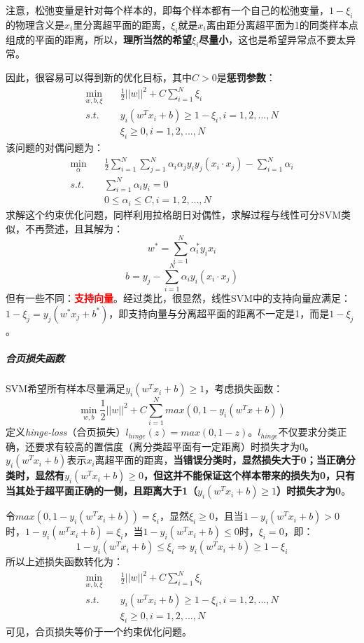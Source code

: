 注意，松弛变量是针对每个样本的，即每个样本都有一个自己的松弛变量，$1-\xi_i$的物理含义是$x_i$里分离超平面的距离，$\xi_i$就是$x_i$离由距分离超平面为1的同类样本点组成的平面的距离，所以，\textbf{理所当然的希望$\xi_i$尽量小}，这也是希望异常点不要太异常。

因此，很容易可以得到新的优化目标，其中$C > 0$是\textbf{惩罚参数}：
\begin{align}
	\mathop{min}_{w, b, \xi}&\quad \frac{1}{2} ||w||^2 + C \sum_{i=1}^{N} \xi_i \nonumber \\
	s.t.&\quad y_i(w^T x_i + b) \geqslant 1 - \xi_i, i = 1, 2, ..., N \nonumber \\
		&\quad \xi_i \geq 0, i = 1, 2, ..., N \nonumber
\end{align}
该问题的对偶问题为：
\begin{align}
	\mathop{min}_{\alpha}\quad &\frac{1}{2} \sum_{i=1}^N \sum_{j=1}^{N} \alpha_i \alpha_j y_i y_j (x_i \cdot x_j) - \sum_{i=1}^N \alpha_i \nonumber \\
	s.t.\quad &\sum_{i=1}^N \alpha_i y_i = 0 \nonumber \\
	&0 \leq \alpha_i \leq C, i = 1, 2, ..., N \nonumber
\end{align}
求解这个约束优化问题，同样利用拉格朗日对偶性，求解过程与线性可分SVM类似，不再赘述，且其解为：
$$
w^* = \sum_{i=1}^N \alpha_i^* y_i x_i
$$
$$
b = y_j - \sum_{i=1}^N \alpha_i y_i (x_i \cdot x_j)
$$
但有一些不同：\textcolor{red}{\textbf{支持向量}}。经过类比，很显然，线性SVM中的支持向量应满足：$1 - \xi_j = y_j ( w^* x_j + b^* ) $，即支持向量与分离超平面的距离不一定是1，而是$1 - \xi_j$。

\subparagraph{合页损失函数}
SVM希望所有样本尽量满足$y_i( w^T x_i + b ) \geq 1$，考虑损失函数：
$$
\mathop{min}_{w, b} \frac{1}{2} ||w||^2 + C \sum_{i=1}^{N} max(0, 1 - y_i (w^T x + b))
$$
定义\textit{hinge-loss}（合页损失）$l_{hinge}(z) = max(0, 1-z)$。$l_{hinge}$不仅要求分类正确，还要求有较高的置信度（离分类超平面有一定距离）时损失才为0。$y_i( w^T x_i + b )$表示$x_i$离超平面的距离，\textbf{当错误分类时，显然损失大于0；当正确分类时，显然有$y_i( w^T x_i + b ) \geq 0$，但这并不能保证这个样本带来的损失为0，只有当其处于超平面正确的一侧，且距离大于1（$y_i( w^T x_i + b ) \geq 1$）时损失才为0}。

令$max(0, 1-y_i (w^T x_i + b)) = \xi_i$，显然$\xi_i \geq 0$，且当$1-y_i (w^T x_i + b) > 0$时，$1-y_i (w^T x_i + b) = \xi_i$，当$1-y_i (w^T x_i + b) \leq 0$时，$\xi_i = 0$，即：
$$
1-y_i (w^T x_i + b) \leq \xi_i \Longrightarrow y_i (w^T x_i + b) \geq 1 - \xi_i
$$
所以上述损失函数转化为：
\begin{align}
	\mathop{min}_{w, b, \xi}&\quad \frac{1}{2} ||w||^2 + C \sum_{i=1}^{N} \xi_i \nonumber \\
	s.t.&\quad y_i(w^T x_i + b) \geqslant 1 - \xi_i, i = 1, 2, ..., N \nonumber \\
	&\quad \xi_i \geq 0, i = 1, 2, ..., N \nonumber
\end{align}
可见，合页损失等价于一个约束优化问题。

